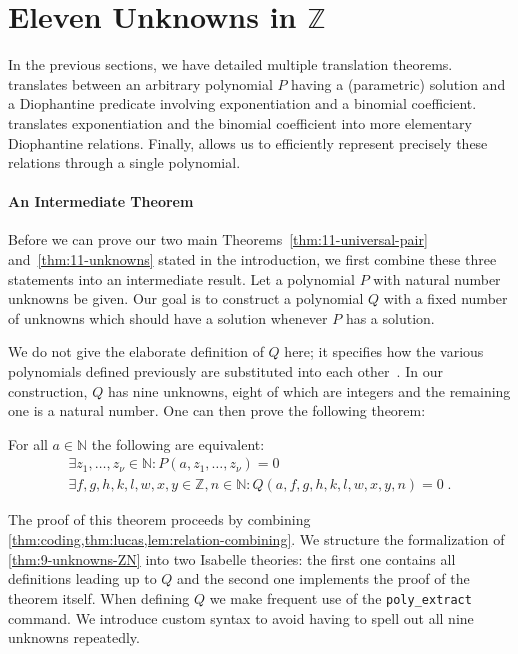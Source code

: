 \documentclass[a4paper,USenglish,cleveref,autoref,thm-restate]{lipics-v2021}
\newcommand{\N}{{\mathbb N}}
\newcommand{\Z}{{\mathbb Z}}
\begin{document}


\section{Eleven Unknowns in \texorpdfstring{$\Z$}{Z}}

In the previous sections, we have detailed multiple translation theorems.  translates between an arbitrary polynomial $P$ having a (parametric) solution and a Diophantine predicate involving exponentiation and a binomial coefficient.  translates exponentiation and the binomial coefficient into more elementary Diophantine relations. Finally,  allows us to efficiently represent precisely these relations through a single polynomial. 

\paragraph*{An Intermediate Theorem}
Before we can prove our two main Theorems~\ref{thm:11-universal-pair} and~\ref{thm:11-unknowns} stated in the introduction, we first combine these three statements into an intermediate result. Let a polynomial $P$ with natural number unknowns be given. Our goal is to construct a polynomial $Q$ with a fixed number of unknowns which should have a solution whenever $P$ has a solution. 

We do not give the elaborate definition of $Q$ here; it specifies how the various polynomials defined previously are substituted into each other~\cite[Definition 5.2]{manuscript}. In our construction, $Q$ has nine unknowns, eight of which are integers and the remaining one is a natural number. One can then prove the following theorem:

\begin{theorem}[9 Unknowns in $\Z$ and $\N$~{\cite[Theorem 3]{manuscript}}] \label{thm:9-unknowns-ZN}
For all $a \in \N$ the following are equivalent: 
\begin{gather} \label{eq:P-solution}
\exists z_1, \ldots, z_\nu \in \N \colon 
    P(a, z_1, \ldots, z_\nu) = 0 \\
\exists f, g, h, k, l, w, x, y \in \Z, n \in \N \colon 
    Q(a, f, g, h, k, l, w, x, y, n) = 0 \;. 
    \label{eq:Q-solution}
\end{gather}
\end{theorem}

The proof of this theorem proceeds by combining \cref{thm:coding,thm:lucas,lem:relation-combining}. We structure the formalization of \cref{thm:9-unknowns-ZN} into two Isabelle theories: the first one contains all definitions leading up to $Q$ and the second one implements the proof of the theorem itself. When defining $Q$ we make frequent use of the \texttt{poly\_extract} command. We introduce custom syntax to avoid having to spell out all nine unknowns repeatedly. 
\end{document}
